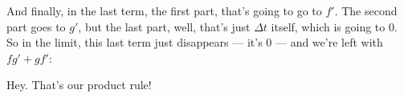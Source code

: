 \documentclass[pdftex, brazil, 12pt, twoside]{article}
\begin{document}
\begin{figure}[H]
  \begin{center}
  \end{center}
\end{figure}

And finally, in the last term, the first part,
that's going to go to $f'$.
The second part goes to $g'$, but the last part, well, that's
just $\Delta t$ itself, which is going to 0.
So in the limit, this last term just disappears --- it's 0 ---
and we're left with $fg' + gf'$:

\begin{figure}[H]
  \begin{center}
  \end{center}
\end{figure}

Hey. That's our product rule!

\end{document}
